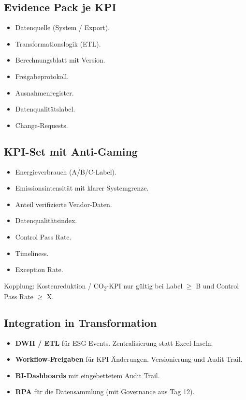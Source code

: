 \documentclass[11pt,a4paper,oneside]{article}
\begin{document}
\subsection{Evidence Pack je KPI}

\begin{itemize}
  \item Datenquelle (System / Export).
  \item Transformationslogik (ETL).
  \item Berechnungsblatt mit Version.
  \item Freigabeprotokoll.
  \item Ausnahmenregister.
  \item Datenqualitätslabel.
  \item Change-Requests.
\end{itemize}

\subsection{KPI-Set mit Anti-Gaming}

\begin{itemize}
  \item Energieverbrauch (A/B/C-Label).
  \item Emissionsintensität mit klarer Systemgrenze.
  \item Anteil verifizierte Vendor-Daten.
  \item Datenqualitätsindex.
  \item Control Pass Rate.
  \item Timeliness.
  \item Exception Rate.
\end{itemize}

Kopplung: Kostenreduktion / CO\textsubscript{2}-KPI nur gültig bei Label $\geq$ B und Control Pass Rate $\geq$ X.

\subsection{Integration in Transformation}

\begin{itemize}
  \item \textbf{DWH / ETL} für ESG-Events. Zentralisierung statt Excel-Inseln.
  \item \textbf{Workflow-Freigaben} für KPI-Änderungen. Versionierung und Audit Trail.
  \item \textbf{BI-Dashboards} mit eingebettetem Audit Trail.
  \item \textbf{RPA} für die Datensammlung (mit Governance aus Tag 12).
\end{itemize}
\end{document}
